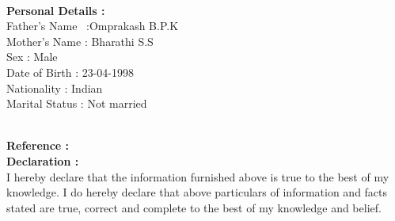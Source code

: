 \documentclass[1pt]{article}
\begin{document}
\begin{flushleft}
		
		\hspace{1cm}\\ \hspace{1cm}
		
		
		{\small \textbf{ Personal Details :}}\\
		\hspace{1cm}Father's Name \ :Omprakash B.P.K\\	
		\hspace{1cm}Mother's Name : Bharathi S.S\\
		\hspace{1cm}Sex : Male\\	
		\hspace{1cm}Date of Birth : 23-04-1998\\
		\hspace{1cm}Nationality : Indian\\
		\hspace{1cm}Marital Status : Not married\\
		
		\hspace{1cm}\\ \hspace{1cm}
		
		{\small \textbf{Reference :}}\\
		{\small \textbf{Declaration : }}\\
		\hspace{1cm}I hereby declare that the information furnished above is true to the best of my knowledge. I do hereby declare that above particulars of information and facts stated are true, correct and complete to the best of my knowledge and belief.\\ 
			
	\end{flushleft}
	
\end{document}

